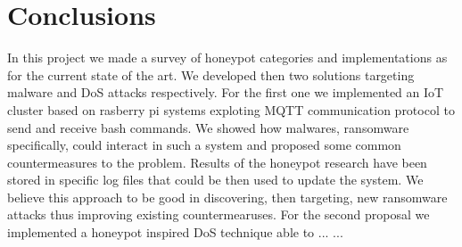 \chapter{Conclusions}
In this project we made a survey of honeypot categories and implementations as for the current state of the art. We developed then two solutions targeting malware and DoS attacks respectively. For the first one we implemented an IoT cluster based on rasberry pi systems exploting MQTT communication protocol to send and receive bash commands. We showed how malwares, ransomware specifically, could interact in such a system and proposed some common countermeasures to the problem. Results of the honeypot research have been stored in specific log files that could be then used to update the system. We believe this approach to be good in discovering, then targeting, new ransomware attacks thus improving existing countermearuses. For the second proposal we implemented a honeypot inspired DoS technique able to ... ...